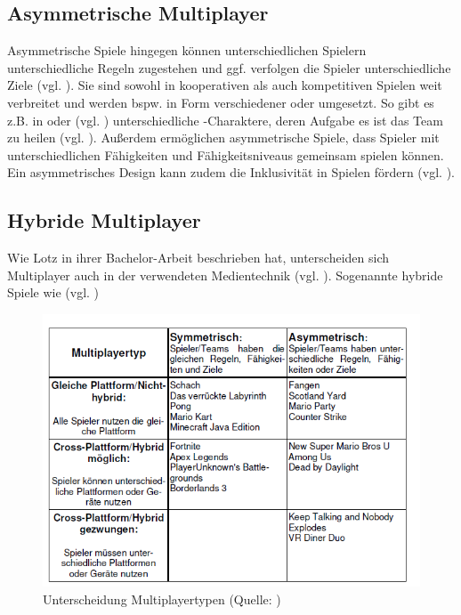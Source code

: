 \subsection{Asymmetrische Multiplayer}
Asymmetrische Spiele hingegen können unterschiedlichen Spielern unterschiedliche Regeln zugestehen und ggf. verfolgen die Spieler unterschiedliche Ziele (vgl. \citealp[S. 12]{adams_fundamentals_2013}). Sie sind sowohl in kooperativen als auch kompetitiven Spielen weit verbreitet und werden bspw. in Form verschiedener  oder  umgesetzt. So gibt es z.B. in  oder  (vgl. \citealp{noauthor_league_2025, noauthor_overwatch_nodate}) unterschiedliche -Charaktere, deren Aufgabe es ist das Team zu heilen (vgl. \citealp[S. 307f]{smilovitch_birdquestvr_2019}).
Außerdem ermöglichen asymmetrische Spiele, dass Spieler mit unterschiedlichen Fähigkeiten und Fähigkeitsniveaus gemeinsam spielen können. Ein asymmetrisches Design kann zudem die Inklusivität in Spielen fördern (vgl. \citealp[S. 308]{smilovitch_birdquestvr_2019}).

\subsection{Hybride Multiplayer}
Wie Lotz in ihrer Bachelor-Arbeit beschrieben hat, unterscheiden sich Multiplayer auch in der verwendeten Medientechnik (vgl. \citealp[S. 6f]{lotz_konzeption_2021}). Sogenannte hybride Spiele wie  (vgl. \citealp{nintendo_mario_2012-1})

\begin{figure}[ht]
\centering
\includegraphics[width=1\linewidth]{content/pictures/lotz_hybrid_multiplayer.PNG}
\caption{Unterscheidung Multiplayertypen (Quelle: \citealp[S.6]{lotz_konzeption_2021})}
\label{fig:lotz_multiplayer_types}
\end{figure}

